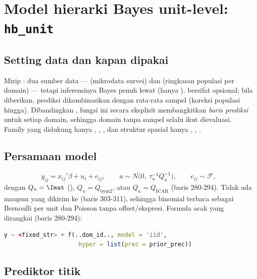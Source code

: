 \section{Model hierarki Bayes unit-level: \texttt{hb\_unit}}\label{sec:hbunit}

\subsection{Setting data dan kapan dipakai}\label{sec:hbunit-setting}

Mirip : dua sumber data ---  (mikrodata
survei) dan  (ringkasan populasi per domain) --- tetapi inferensinya
Bayes penuh lewat  (hanya ). 
bersifat opsional; bila diberikan, prediksi dikombinasikan dengan rata-rata
sampel (koreksi populasi hingga). Dibandingkan , fungsi ini secara eksplisit
membangkitkan \emph{baris prediksi} untuk setiap domain, sehingga domain tanpa
sampel selalu ikut dievaluasi. Family yang didukung hanya
, , , dan struktur spasial hanya
, , .

\subsection{Persamaan model}\label{sec:hbunit-model}

\begin{equation}
  y_{ij}=x_{ij}'\beta+u_i+e_{ij},\qquad
  u\sim N\bigl(0,\;\tau_u^{-1}Q_u^{-1}\bigr),\qquad
  e_{ij}\sim\mathcal F,
  \label{eq:hbunit-model}
\end{equation}
dengan $Q_u=\Imat$ (), $Q_u=Q_{\text{bym2}}$,
atau $Q_u=Q_{\text{ICAR}}$ (baris 280-294). Tidak ada  maupun
 yang dikirim ke  (baris 303-311), sehingga binomial
terbaca sebagai Bernoulli per unit dan Poisson tanpa offset/ekspresi.
Formula acak yang dirangkai (baris 280-294):
\begin{lstlisting}[language=R]
y ~ <fixed_str> + f(..dom_id.., model = 'iid',
                     hyper = list(prec = prior_prec))
\end{lstlisting}

\subsection{Prediktor titik}\label{sec:hbunit-prediktor}

